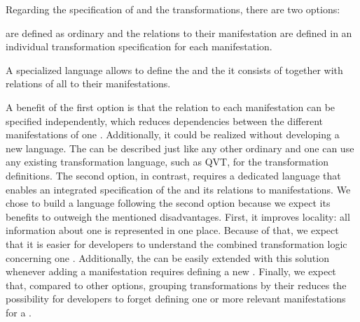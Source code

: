 Regarding the specification of \conceptmetamodels and the transformations, there are two options:
\begin{description}[leftmargin=\parindent]
    \item[External concept definition:] \Conceptmetamodels are defined as ordinary \metamodels and the relations to their manifestation are defined in an individual transformation specification %
    for each manifestation. %
    \item[Internal concept definition:] A specialized language allows to define the \conceptmetamodel and the \commonalities it consists of together with relations of all \commonalities to their manifestations. %
\end{description}

A benefit of the first option is that the relation to each manifestation can be specified independently, which reduces dependencies between the different manifestations of one \conceptmetamodel.
Additionally, it could be realized without developing a new language. The \conceptmetamodels can be described just like any other ordinary \metamodel and one can use any existing transformation language, such as QVT, for the transformation definitions.
The second option, in contrast, requires a dedicated language that enables an integrated specification of the \conceptmetamodel and its relations to manifestations.
We chose to build a language following the second option because we expect its benefits to outweigh the mentioned disadvantages.
First, it improves locality: all information about one \commonality is represented in one place.
Because of that, we expect that it is easier for developers to understand the combined transformation logic concerning one \commonality.
Additionally, the \conceptmetamodel can be easily extended with this solution whenever adding a manifestation requires defining a new \commonality.
Finally, we expect that, compared to other options, grouping transformations by their \commonality reduces the possibility for developers to forget defining one or more relevant manifestations for a \commonality.


